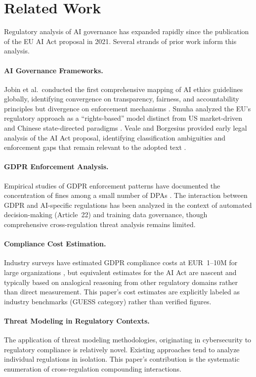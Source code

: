 \documentclass[11pt,a4paper]{article}
\begin{document}
\section{Related Work}
\label{sec:related-work}

Regulatory analysis of AI governance has expanded rapidly since the publication of the EU AI Act proposal in 2021. Several strands of prior work inform this analysis.

\paragraph{AI Governance Frameworks.} Jobin et al.\ conducted the first comprehensive mapping of AI ethics guidelines globally, identifying convergence on transparency, fairness, and accountability principles but divergence on enforcement mechanisms \cite{jobin2019}. Smuha analyzed the EU's regulatory approach as a ``rights-based'' model distinct from US market-driven and Chinese state-directed paradigms \cite{smuha2021}. Veale and Borgesius provided early legal analysis of the AI Act proposal, identifying classification ambiguities and enforcement gaps that remain relevant to the adopted text \cite{veale2021}.

\paragraph{GDPR Enforcement Analysis.} Empirical studies of GDPR enforcement patterns have documented the concentration of fines among a small number of DPAs \cite{gdprenforcement2023}. The interaction between GDPR and AI-specific regulations has been analyzed in the context of automated decision-making (Article~22) and training data governance, though comprehensive cross-regulation threat analysis remains limited.

\paragraph{Compliance Cost Estimation.} Industry surveys have estimated GDPR compliance costs at EUR~1--10M for large organizations \cite{iapp2023}, but equivalent estimates for the AI Act are nascent and typically based on analogical reasoning from other regulatory domains rather than direct measurement. This paper's cost estimates are explicitly labeled as industry benchmarks (GUESS category) rather than verified figures.

\paragraph{Threat Modeling in Regulatory Contexts.} The application of threat modeling methodologies, originating in cybersecurity \cite{shostack2014} to regulatory compliance is relatively novel. Existing approaches tend to analyze individual regulations in isolation. This paper's contribution is the systematic enumeration of cross-regulation compounding interactions.
\end{document}
